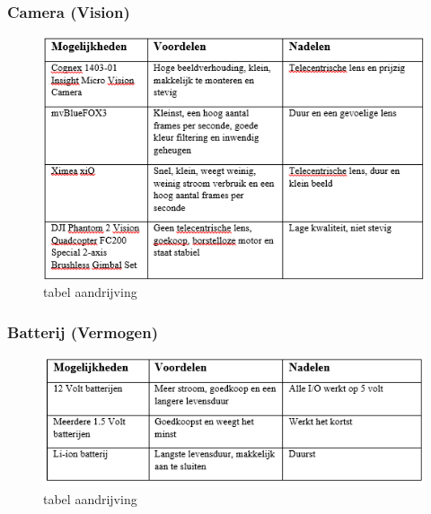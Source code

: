 \documentclass[12pt]{article} %
\begin{document}
\subsubsection{Camera (Vision)}
\begin{center}
\begin{figure}[h]
\includegraphics[scale=1.]{tabelCam.png}
\caption{tabel aandrijving}
\label{fig:deployment}
\end{figure}
\end{center}
\clearpage

\subsubsection{Batterij (Vermogen)}
\begin{center}
\begin{figure}[h]
\includegraphics[scale=1.]{tabelBat.png}
\caption{tabel aandrijving}
\label{fig:deployment}
\end{figure}
\end{center}
\clearpage
\end{document}
